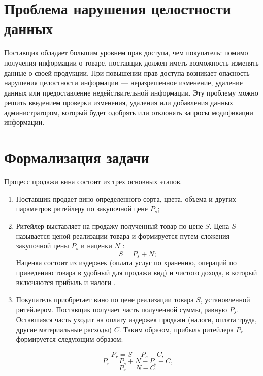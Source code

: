 \section{Проблема нарушения целостности данных}

Поставщик обладает большим уровнем прав доступа, чем покупатель: помимо получения информации о товаре, поставщик должен иметь возможность изменять данные о своей продукции. При повышении прав доступа возникает опасность нарушения целостности информации --- неразрешенное изменение, удаление данных или предоставление недействительной информации. Эту проблему можно решить введением проверки изменения, удаления или добавления данных администратором, который будет одобрять или отклонять запросы модификации информации. 

\section{Формализация задачи}

Процесс продажи вина состоит из трех основных этапов.

\begin{enumerate}
	\item Поставщик продает вино определенного сорта, цвета, объема и других параметров ритейлеру по закупочной цене $P_{s}$;
	\item Ритейлер выставляет на продажу полученный товар по цене $S$. Цена $S$ называется ценой реализации товара и формируется путем сложения закупочной цены $P_{s}$ и наценки $N$ \cite{pricing}:
\begin{equation}
    S = P_{s} + N;
\end{equation}
Наценка состоит из издержек (оплата услуг по хранению, операций по приведению товара в удобный для продажи вид) и чистого дохода, в который включаются прибыль и налоги \cite{pricing}. 
	\item Покупатель приобретает вино по цене реализации товара $S$, установленной ритейлером. Поставщик получает часть полученной суммы, равную $P_{s}$. Оставшаяся часть уходит на оплату издержек продажи (налоги, оплата труда, другие материальные расходы) $C$. Таким образом, прибыль ритейлера $P_{r}$ формируется следующим образом:
	
\begin{equation}
    P_{r} = S - P_{s} - C,
\end{equation}
\begin{equation}
    P_{r} = P_{s} + N - P_{s} - C,
\end{equation}
\begin{equation}
    P_{r} = N - C.
\end{equation}
\end{enumerate}

